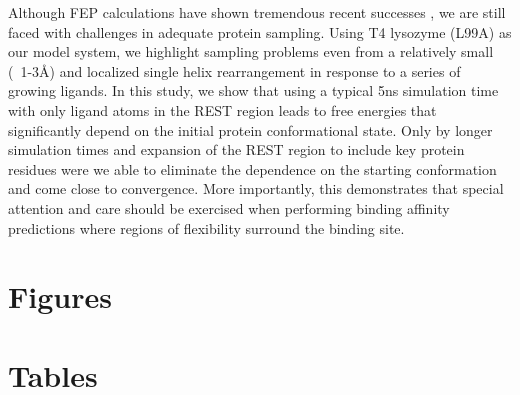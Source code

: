 \documentclass[journal=jctcce,manuscript=article]{achemso}
\begin{document}
Although FEP calculations have shown tremendous recent successes \cite{FEPplus}, we are still faced with challenges in adequate protein sampling.
Using T4 lysozyme (L99A) as our model system, we highlight sampling problems even from a relatively small (~1-3\AA) and localized single helix rearrangement in response to a series of growing ligands.
In this study, we show that using a typical 5ns simulation time with only ligand atoms in the REST region leads to free energies that significantly depend on the initial protein conformational state. 
Only by longer simulation times and expansion of the REST region to include key protein residues were we able to eliminate the dependence on the starting conformation and come close to convergence.
More importantly, this demonstrates that special attention and care should be exercised when performing binding affinity predictions where regions of flexibility surround the binding site. 

\pagebreak
\section*{Figures}


\clearpage
\section*{Tables}


\clearpage


\pagebreak

\end{document}

